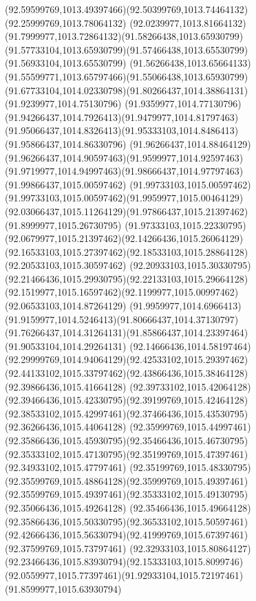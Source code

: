 {{		\curveto(92.59599769,1013.49397466)(92.50399769,1013.74464132)(92.25999769,1013.78064132)
		\curveto(92.0239977,1013.81664132)(91.7999977,1013.72864132)(91.58266438,1013.65930799)
		\curveto(91.57733104,1013.65930799)(91.57466438,1013.65530799)(91.56933104,1013.65530799)
		\curveto(91.56266438,1013.65664133)(91.55599771,1013.65797466)(91.55066438,1013.65930799)
		\curveto(91.67733104,1014.02330798)(91.80266437,1014.38864131)(91.9239977,1014.75130796)
		\curveto(91.9359977,1014.77130796)(91.94266437,1014.7926413)(91.9479977,1014.81797463)
		\curveto(91.95066437,1014.8326413)(91.95333103,1014.8486413)(91.95866437,1014.86330796)
		\curveto(91.96266437,1014.88464129)(91.96266437,1014.90597463)(91.9599977,1014.92597463)
		\curveto(91.9719977,1014.94997463)(91.98666437,1014.97797463)(91.99866437,1015.00597462)
		\curveto(91.99733103,1015.00597462)(91.99733103,1015.00597462)(91.9959977,1015.00464129)
		\curveto(92.03066437,1015.11264129)(91.97866437,1015.21397462)(91.8999977,1015.26730795)
		\curveto(91.97333103,1015.22330795)(92.0679977,1015.21397462)(92.14266436,1015.26064129)
		\curveto(92.16533103,1015.27397462)(92.18533103,1015.28864128)(92.20533103,1015.30597462)
		\curveto(92.20933103,1015.30330795)(92.21466436,1015.29930795)(92.22133103,1015.29664128)
		\curveto(92.1519977,1015.16597462)(92.1199977,1015.00997462)(92.06533103,1014.87264129)
		\curveto(91.9959977,1014.6966413)(91.9159977,1014.5246413)(91.80666437,1014.37130797)
		\curveto(91.76266437,1014.31264131)(91.85866437,1014.23397464)(91.90533104,1014.29264131)
		\curveto(92.14666436,1014.58197464)(92.29999769,1014.94064129)(92.42533102,1015.29397462)
		\curveto(92.44133102,1015.33797462)(92.43866436,1015.38464128)(92.39866436,1015.41664128)
		\curveto(92.39733102,1015.42064128)(92.39466436,1015.42330795)(92.39199769,1015.42464128)
		\curveto(92.38533102,1015.42997461)(92.37466436,1015.43530795)(92.36266436,1015.44064128)
		\curveto(92.35999769,1015.44997461)(92.35866436,1015.45930795)(92.35466436,1015.46730795)
		\curveto(92.35333102,1015.47130795)(92.35199769,1015.47397461)(92.34933102,1015.47797461)
		\curveto(92.35199769,1015.48330795)(92.35599769,1015.48864128)(92.35999769,1015.49397461)
		\curveto(92.35599769,1015.49397461)(92.35333102,1015.49130795)(92.35066436,1015.49264128)
		\curveto(92.35466436,1015.49664128)(92.35866436,1015.50330795)(92.36533102,1015.50597461)
		\curveto(92.42666436,1015.56330794)(92.41999769,1015.67397461)(92.37599769,1015.73797461)
		\curveto(92.32933103,1015.80864127)(92.23466436,1015.83930794)(92.15333103,1015.8099746)
		\curveto(92.0559977,1015.77397461)(91.92933104,1015.72197461)(91.8599977,1015.63930794)
}}
